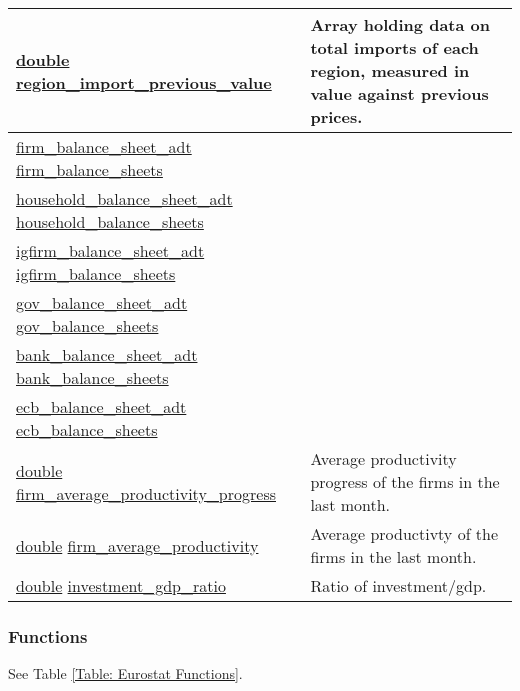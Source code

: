 \documentclass[a4paper,11pt]{article}
\begin{document}
\begin{landscape}
\begin{longtable}[H!]{ll}
\midrule
\url{double} \url{region_import_previous_value} & \parbox{10cm}{Array holding data on total imports of each region, measured in value against previous prices.} \\
\midrule
\url{firm_balance_sheet_adt} \url{firm_balance_sheets} & \parbox{10cm}{} \\
\midrule
\url{household_balance_sheet_adt} \url{household_balance_sheets} & \parbox{10cm}{} \\
\midrule
\url{igfirm_balance_sheet_adt} \url{igfirm_balance_sheets} & \parbox{10cm}{} \\
\midrule
\url{gov_balance_sheet_adt} \url{gov_balance_sheets} & \parbox{10cm}{} \\
\midrule
\url{bank_balance_sheet_adt} \url{bank_balance_sheets} & \parbox{10cm}{} \\
\midrule
\url{ecb_balance_sheet_adt} \url{ecb_balance_sheets} & \parbox{10cm}{} \\
\midrule
\url{double} \url{firm_average_productivity_progress} & \parbox{10cm}{Average productivity progress of the firms in the last month.} \\
\midrule
\url{double} \url{firm_average_productivity} & \parbox{10cm}{Average productivty of the firms in the last month.} \\
\midrule
\url{double} \url{investment_gdp_ratio} & \parbox{10cm}{Ratio of investment/gdp.} \\
\end{longtable}
\end{landscape}

\subsubsection{Functions}
See Table \ref{Table: Eurostat Functions}.
\end{document}
